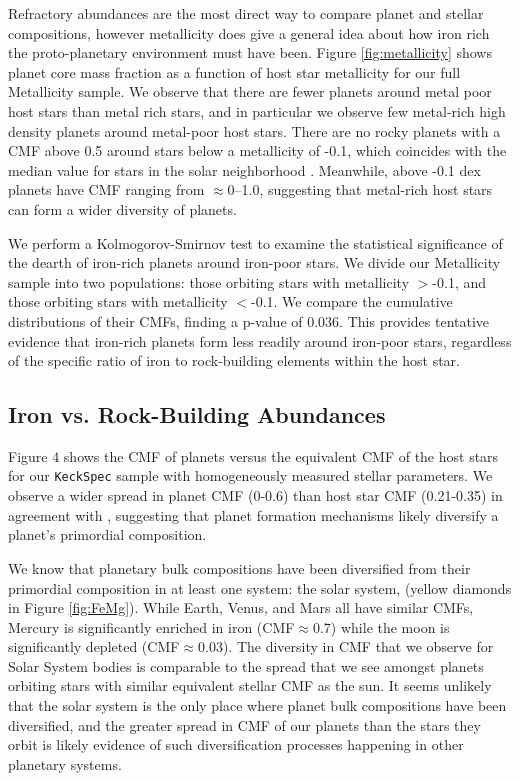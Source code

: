 \documentclass[twocolumn]{aastex631}
\begin{document}
Refractory abundances are the most direct way to compare planet and stellar compositions, however metallicity does give a general idea about how iron rich the proto-planetary environment must have been. Figure \ref{fig:metallicity} shows planet core mass fraction as a function of host star metallicity for our full Metallicity sample. We observe that there are fewer planets around metal poor host stars than metal rich stars, and in particular we observe few metal-rich high density planets around metal-poor host stars. There are no rocky planets with a CMF above 0.5 around stars below a metallicity of -0.1, which coincides with the median value for stars in the solar neighborhood \citep{2016MNRAS.455..987C}. Meanwhile, above -0.1 dex planets have CMF ranging from $\approx$0--1.0, suggesting that metal-rich host stars can form a wider diversity of planets. 

We perform a Kolmogorov-Smirnov test to examine the statistical significance of the dearth of iron-rich planets around iron-poor stars. We divide our Metallicity sample into two populations: those orbiting stars with metallicity $>$-0.1, and those orbiting stars with metallicity $<$-0.1. We compare the cumulative distributions of their CMFs, finding a p-value of 0.036. This provides tentative evidence that iron-rich planets form less readily around iron-poor stars, regardless of the specific ratio of iron to rock-building elements within the host star.

\subsection{Iron vs. Rock-Building Abundances}
Figure 4 shows the CMF of planets versus the equivalent CMF of the host stars for our \texttt{KeckSpec} sample with homogeneously measured stellar parameters. We observe a wider spread in planet CMF (0-0.6) than host star CMF (0.21-0.35) in agreement with \citep{Plotnykov2020}, suggesting that planet formation mechanisms likely diversify a planet's primordial composition. 

We know that planetary bulk compositions have been diversified from their primordial composition in at least one system: the solar system, (yellow diamonds in Figure \ref{fig:FeMg}). While Earth, Venus, and Mars all have similar CMFs, Mercury is significantly enriched in iron (CMF$\approx$0.7) while the moon is significantly depleted (CMF$\approx$0.03). The diversity in CMF that we observe for Solar System bodies is comparable to the spread that we see amongst planets orbiting stars with similar equivalent stellar CMF as the sun. It seems unlikely that the solar system is the only place where planet bulk compositions have been diversified, and the greater spread in CMF of our planets than the stars they orbit is likely evidence of such diversification processes happening in other planetary systems.
\end{document}
